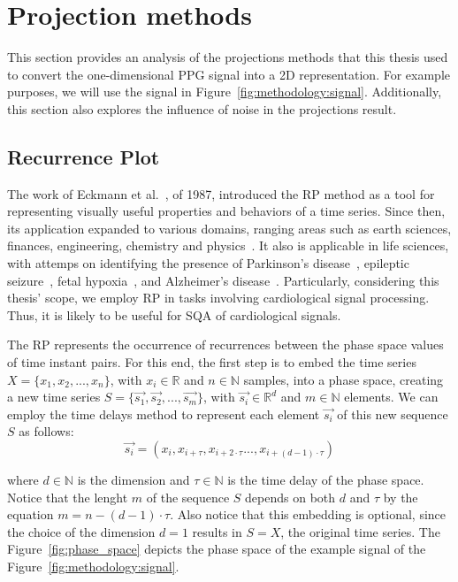 

\section{Projection methods}

This section provides an analysis of the projections methods that this thesis used to convert the one-dimensional \gls{PPG} signal into a 2D representation. For example purposes, we will use the signal in Figure~\ref{fig:methodology:signal}. Additionally, this section also explores the influence of noise in the projections result. 



\subsection{Recurrence Plot}

The work of Eckmann et al.~\cite{rp-1}, of 1987, introduced the \gls{RP} method as a tool for representing visually useful properties and behaviors of a time series. Since then, its application expanded to various domains, ranging areas such as earth sciences, finances, engineering, chemistry and physics~\cite{rp-2}. It also is applicable in life sciences, with attemps on identifying the presence of Parkinson's disease~\cite{rp-3}, epileptic seizure~\cite{rp-4}, fetal hypoxia~\cite{rp-5}, and Alzheimer's disease~\cite{rp-6}. Particularly, considering this thesis' scope, we employ \gls{RP} in tasks involving cardiological signal processing. Thus, it is likely to be useful for \gls{SQA} of cardiological signals.  

The \gls{RP} represents the occurrence of recurrences between the phase space values of time instant pairs. For this end, the first step is to embed the time series $X=\{x_1,x_2,...,x_n\}$, with $ x_i \in \mathbb{R}$ and $n \in \mathbb{N}$ samples, into a phase space, creating a new time series $S=\{\vec{s_1},\vec{s_2},...,\vec{s_m}\}$, with $ \vec{s_i} \in \mathbb{R}^d$ and $m \in \mathbb{N}$ elements. We can employ the time delays method to represent each element $\vec{s_i}$ of this new sequence $S$ as follows:
\begin{equation}
    \vec{s_i} = (x_i, x_{i + \tau}, x_{i + 2\cdot \tau} ..., x_{i + (d-1) \cdot \tau})
\end{equation}   

\noindent where $d \in \mathbb{N}$ is the dimension and $\tau \in \mathbb{N}$ is the time delay of the phase space. Notice that the lenght $m$ of the sequence $S$ depends on both $d$ and $\tau$ by the equation $m = n - (d-1) \cdot \tau$. Also notice that this embedding is optional, since the choice of the dimension $d=1$ results in $S=X$, the original time series. The Figure~\ref{fig:phase_space} depicts the phase space of the example signal of the Figure~\ref{fig:methodology:signal}.

